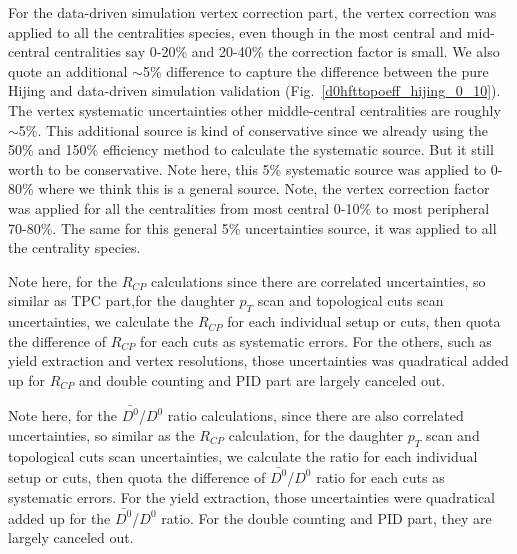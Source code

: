 For the data-driven simulation vertex correction part, the vertex correction was applied to all the centralities species, even though in the most central and mid-central centralities say 0-20\% and 20-40\% the correction factor is small. We also quote an additional $\sim$5\% difference to capture the difference between the pure Hijing and data-driven simulation validation (Fig.~\ref{d0hfttopoeff_hijing_0_10}). The vertex systematic uncertainties other middle-central centralities are roughly $\sim$5\%. This additional source is kind of conservative since we already using the 50\% and 150\% efficiency method to calculate the systematic source. But it still worth to be conservative. Note here, this 5\% systematic source was applied to 0-80\% where we think this is a general source. Note, the vertex correction factor was applied for all the centralities from most central 0-10\% to most peripheral 70-80\%. The same for this general 5\% uncertainties source, it was applied to all the centrality species. 

Note here, for the $R_{CP}$ calculations since there are correlated uncertainties, so similar as TPC part,for the daughter $p_T$ scan and topological cuts scan uncertainties, we calculate the $R_{CP}$ for each individual setup or cuts, then quota the difference of $R_{CP}$ for each cuts as systematic errors. For the others, such as yield extraction and vertex resolutions, those uncertainties was quadratical added up for $R_{CP}$ and double counting and PID part are largely canceled out.

Note here, for the $\bar{D^{0}}$/$D^{0}$ ratio calculations, since there are also correlated uncertainties, so similar as the $R_{CP}$ calculation, for the daughter $p_T$ scan and topological cuts scan uncertainties, we calculate the ratio for each individual setup or cuts, then quota the difference of $\bar{D^{0}}$/$D^{0}$ ratio for each cuts as systematic errors. For the yield extraction, those uncertainties were quadratical added up for the $\bar{D^{0}}$/$D^{0}$ ratio. For the double counting and PID part, they are largely canceled out.

